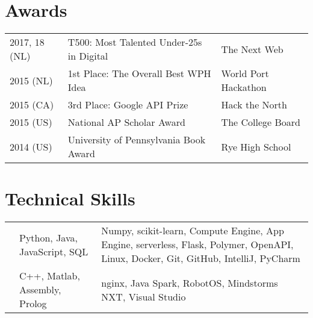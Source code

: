 \documentclass[]{deedy-resume-openfont}
\begin{document}
\begin{minipage}[t]{0.66\textwidth}
\section{Awards} 
\begin{tabular}{lll}
2017, 18 (NL)   & T500: Most Talented Under-25s in Digital  & The Next Web\\
2015 (NL)   & 1st Place: The Overall Best WPH Idea      & World Port Hackathon\\
2015 (CA)   & 3rd Place: Google API Prize               & Hack the North\\
2015 (US)   & National AP Scholar Award                 & The College Board\\
2014 (US)   & University of Pennsylvania Book Award     & Rye High School\\
\end{tabular}
\vspace{0.1\topsep}


\section{Technical Skills}
\vspace{-\topsep}
\settowidth{}
\begin{tabulary}{\linewidth}{LLL}
    &  &  \\
    \hline
     & Python, Java, JavaScript, SQL & Numpy, scikit-learn, Compute Engine, App Engine, serverless, Flask, Polymer, OpenAPI, Linux, Docker, Git, GitHub, IntelliJ, PyCharm \\
    \hline
     & C++, Matlab, Assembly, Prolog & nginx, Java Spark, RobotOS, Mindstorms NXT, Visual Studio
\end{tabulary} 

\end{minipage} 
\end{document}
